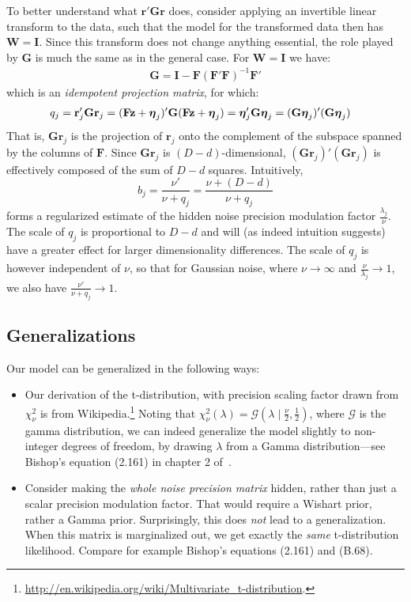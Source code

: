 \documentclass[a4paper,oneside,12pt,english]{report}
\def\zvec{\mathbf{z}}
\def\Wmat{\mathbf{W}}
\def\Fmat{\mathbf{F}}
\def\Gmat{\mathbf{G}}
\def\Imat{\mathbf{I}}
\def\Gmat{\mathbf{G}}
\def\rvec{\mathbf{r}}
\begin{document}
To better understand what $\rvec'\Gmat\rvec$ does, consider applying an invertible linear transform to the data, such that the model for the transformed data then has $\Wmat=\Imat$. Since this transform does not change anything essential, the role played by $\Gmat$ is much the same as in the general case. For $\Wmat=\Imat$ we have:
\begin{align*}
\Gmat=\Imat - \Fmat(\Fmat'\Fmat)^{-1}\Fmat'
\end{align*}
which is an \emph{idempotent projection matrix}, for which:
\begin{align*}
q_j &= \rvec_j'\Gmat\rvec_j = (\Fmat\zvec+\etavec_j)'\Gmat(\Fmat\zvec+\etavec_j) = \etavec_j'\Gmat\etavec_j = (\Gmat\etavec_j)'(\Gmat\etavec_j)
\end{align*}
That is, $\Gmat\rvec_j$ is the projection of $\rvec_j$ onto the complement of the subspace spanned by the columns of $\Fmat$. Since $\Gmat\rvec_j$ is $(D-d)$-dimensional, $(\Gmat\rvec_j)'(\Gmat\rvec_j)$ is effectively composed of the sum of $D-d$ squares. Intuitively, 
$$b_j=\frac{\nu'}{\nu+q_j}=\frac{\nu+(D-d)}{\nu+q_j}$$ 
forms a regularized estimate of the hidden noise precision modulation factor $\frac{\lambda_j}{\nu}$. The scale of $q_j$ is proportional to $D-d$ and will (as indeed intuition suggests) have a greater effect for larger dimensionality differences. The scale of $q_j$ is however independent of $\nu$, so that for Gaussian noise, where $\nu\to\infty$ and $\frac{\nu}{\lambda_j}\to1$, we also have $\frac{\nu'}{\nu+q_j}\to1$. 


\subsection{Generalizations}
\def\GD{\mathcal{G}}
Our model can be generalized in the following ways:
\begin{itemize}
	\item Our derivation of the t-distribution, with precision scaling factor drawn from $\chi^2_\nu$ is from Wikipedia.\footnote{\url{http://en.wikipedia.org/wiki/Multivariate_t-distribution}.} Noting that $\chi^2_\nu(\lambda)=\GD(\lambda\mid\tfrac{\nu}{2},\tfrac12)$, where $\GD$ is the gamma distribution, we can indeed generalize the model slightly to non-integer degrees of freedom, by drawing $\lambda$ from a Gamma distribution---see Bishop's equation (2.161) in chapter 2 of~\cite{PRML}. 
%
	\item Consider making the \emph{whole noise precision matrix} hidden, rather than just a scalar precision modulation factor. That would require a Wishart prior, rather a Gamma prior. Surprisingly, this does \emph{not} lead to a generalization. When this matrix is marginalized out, we get exactly the \emph{same} t-distribution likelihood. Compare for example Bishop's equations (2.161) and (B.68).
\end{itemize}
\end{document}
